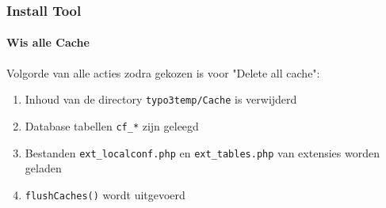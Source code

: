 
\begin{frame}[fragile]
	\frametitle{Install Tool}
	\framesubtitle{Wis alle Cache}

	Volgorde van alle acties zodra gekozen is voor "Delete all cache":

	\begin{enumerate}
		\item Inhoud van de directory \texttt{typo3temp/Cache} is verwijderd
		\item Database tabellen \texttt{cf\_*} zijn geleegd
		\item Bestanden \texttt{ext\_localconf.php} en \texttt{ext\_tables.php}\newline
			van extensies worden geladen
		\item \texttt{flushCaches()} wordt uitgevoerd
	\end{enumerate}

\end{frame}


